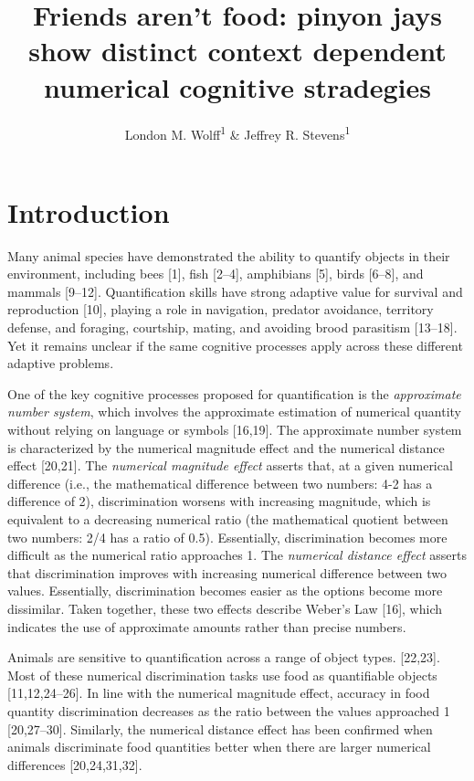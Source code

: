 \documentclass[
  ,doc,floatsintext]{apa6}
\title{Friends aren't food: pinyon jays show distinct context dependent numerical cognitive stradegies}
\author{London M. Wolff\textsuperscript{1} \& Jeffrey R. Stevens\textsuperscript{1}}
\date{}
\affiliation{\vspace{0.5cm}\textsuperscript{1} Department of Psychology, Center for Brain, Biology \& Behavior, University of Nebraska, Lincoln, Lincoln, NE, USA}
\begin{document}
\maketitle

\hypertarget{introduction}{%
\section{Introduction}\label{introduction}}

Many animal species have demonstrated the ability to quantify objects in their environment, including bees {[}1{]}, fish {[}2--4{]}, amphibians {[}5{]}, birds {[}6--8{]}, and mammals {[}9--12{]}. Quantification skills have strong adaptive value for survival and reproduction {[}10{]}, playing a role in navigation, predator avoidance, territory defense, and foraging, courtship, mating, and avoiding brood parasitism {[}13--18{]}. Yet it remains unclear if the same cognitive processes apply across these different adaptive problems.

One of the key cognitive processes proposed for quantification is the \emph{approximate number system}, which involves the approximate estimation of numerical quantity without relying on language or symbols {[}16,19{]}. The approximate number system is characterized by the numerical magnitude effect and the numerical distance effect {[}20,21{]}. The \emph{numerical magnitude effect} asserts that, at a given numerical difference (i.e., the mathematical difference between two numbers: 4-2 has a difference of 2), discrimination worsens with increasing magnitude, which is equivalent to a decreasing numerical ratio (the mathematical quotient between two numbers: 2/4 has a ratio of 0.5). Essentially, discrimination becomes more difficult as the numerical ratio approaches 1. The \emph{numerical distance effect} asserts that discrimination improves with increasing numerical difference between two values. Essentially, discrimination becomes easier as the options become more dissimilar. Taken together, these two effects describe Weber's Law {[}16{]}, which indicates the use of approximate amounts rather than precise numbers.

Animals are sensitive to quantification across a range of object types. {[}22,23{]}. Most of these numerical discrimination tasks use food as quantifiable objects {[}11,12,24--26{]}. In line with the numerical magnitude effect, accuracy in food quantity discrimination decreases as the ratio between the values approached 1 {[}20,27--30{]}. Similarly, the numerical distance effect has been confirmed when animals discriminate food quantities better when there are larger numerical differences {[}20,24,31,32{]}.
\end{document}

